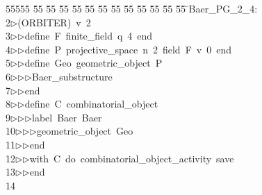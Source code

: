 %
%
\begin{tabbing}
55555 \= 55 \= 55 \= 55 \= 55 \= 55 \= 55 \= 55 \= 55 \= 55 \= 55 \= 55 \= 55 \= \>Baer\_PG\_2\_4:\\[0pt]
2\>$\triangleright$\>(ORBITER)\ v\ 2\ \\[0pt]
3\>$\triangleright$\>$\triangleright$\>define\ F\ finite\_field\ q\ 4\ end\ \\[0pt]
4\>$\triangleright$\>$\triangleright$\>define\ P\ projective\_space\ n\ 2\ field\ F\ v\ 0\ end\ \\[0pt]
5\>$\triangleright$\>$\triangleright$\>define\ Geo\ geometric\_object\ P\ \\[0pt]
6\>$\triangleright$\>$\triangleright$\>$\triangleright$\>Baer\_substructure\ \\[0pt]
7\>$\triangleright$\>$\triangleright$\>end\ \\[0pt]
8\>$\triangleright$\>$\triangleright$\>define\ C\ combinatorial\_object\ \\[0pt]
9\>$\triangleright$\>$\triangleright$\>$\triangleright$\>label\ Baer\ Baer\ \\[0pt]
10\>$\triangleright$\>$\triangleright$\>$\triangleright$\>geometric\_object\ Geo\ \\[0pt]
11\>$\triangleright$\>$\triangleright$\>end\ \\[0pt]
12\>$\triangleright$\>$\triangleright$\>with\ C\ do\ combinatorial\_object\_activity\ save\ \\[0pt]
13\>$\triangleright$\>$\triangleright$\>end\\[0pt]
14\>\end{tabbing}
